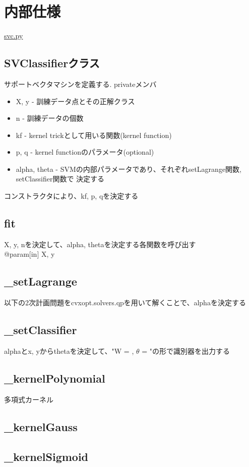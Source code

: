 \documentclass{jsarticle}
\begin{document}
\section{内部仕様}
\underline{svc.py}
\subsection*{SVClassifierクラス}
サポートベクタマシンを定義する.
privateメンバ
\begin{itemize}
    \item X, y - 訓練データ点とその正解クラス
    \item n - 訓練データの個数
    \item kf - kernel trickとして用いる関数(kernel function)
    \item p, q - kernel functionのパラメータ(optional)
    \item alpha, theta - SVMの内部パラメータであり、それぞれsetLagrange関数, setClassifier関数で
    決定する
\end{itemize}
コンストラクタにより、kf, p, qを決定する
\subsection*{fit}
X, y, nを決定して、alpha, thetaを決定する各関数を呼び出す \\
@param[in] X, y

\subsection*{\_setLagrange}
以下の2次計画問題をcvxopt.solvers.qpを用いて解くことで、alphaを決定する \\

\subsection*{\_setClassifier}
alphaとx, yからthetaを決定して、"W = , $\theta$ = "の形で識別器を出力する \\

\subsection*{\_kernelPolynomial}
多項式カーネル

\subsection*{\_kernelGauss}

\subsection*{\_kernelSigmoid}
\end{document}
